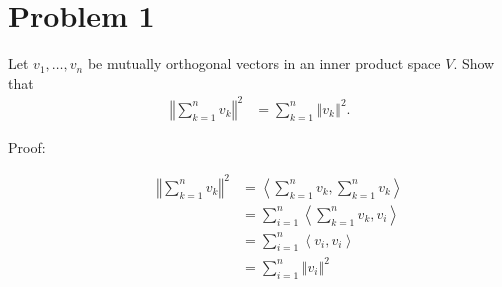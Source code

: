 \documentclass[8pt]{extarticle}
\title{}
\author{}
\date{}
\newcommand{\iprod}[2]{\left\langle #1,#2\right\rangle}
\newcommand{\norm}[1]{\left\Vert #1\right\Vert}
\begin{document}
  \section{Problem 1}%
  Let $v_1,\dots,v_n$ be mutually orthogonal vectors in an inner product space $V$. Show that
  \begin{align*}
    \norm{\sum_{k=1}^{n}v_k}^2 &= \sum_{k=1}^{n}\norm{v_k}^2.
  \end{align*}
  \begin{description}
    \item[Proof:]
      \begin{align*}
        \norm{\sum_{k=1}^{n}v_k}^2 &=\iprod{\sum_{k=1}^{n}v_k}{\sum_{k=1}^{n}v_k} \\
                                   &= \sum_{i=1}^{n}\iprod{\sum_{k=1}^{n}v_k}{v_i}\\
                                   &= \sum_{i=1}^{n}\iprod{v_i}{v_i}\tag*{since for $i\neq j$, $\iprod{v_i}{v_j} = 0$}\\
                                   &= \sum_{i=1}^{n}\norm{v_i}^2
      \end{align*}
  \end{description}
\end{document}
